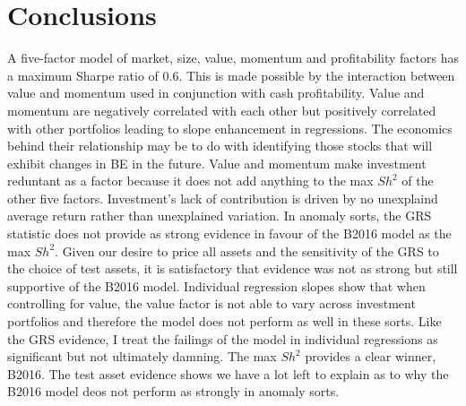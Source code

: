 
\section{Conclusions}

A five-factor model of market, size, value, momentum and profitability factors has a
maximum Sharpe ratio of 0.6. This is made possible by the interaction between value and
momentum used in conjunction with cash profitability. Value and momentum are negatively
correlated with each other but positively correlated with other portfolios leading to
slope enhancement in regressions. The economics behind their relationship may be to do
with identifying those stocks that will exhibit changes in BE in the future. Value and
momentum make investment reduntant as a factor because it does not add anything to the max
$Sh^2$ of the other five factors. Investment's lack of contribution is driven by no
unexplaind average return rather than unexplained variation. In anomaly sorts, the GRS
statistic does not provide as strong evidence in favour of the B2016 model as the max
$Sh^2$. Given our desire to price all assets and the sensitivity of the GRS to the choice
of test assets, it is satisfactory that evidence was not as strong but still supportive of
the B2016 model. Individual regression slopes show that when controlling for value, the
value factor is not able to vary across investment portfolios and therefore the model does
not perform as well in these sorts. Like the GRS evidence, I treat the failings of the
model in individual regressions as significant but not ultimately damning. The max $Sh^2$
provides a clear winner, B2016. The test asset evidence shows we have a lot left to
explain as to why the B2016 model deos not perform as strongly in anomaly sorts.
